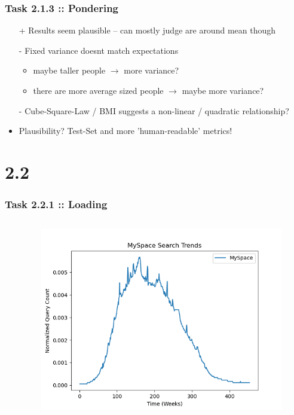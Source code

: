\documentclass[10pt,aspectratio=169,handout]{beamer}
\begin{document}
\begin{frame}
    \frametitle{Task 2.1.3 :: Pondering}

    \begin{itemize}
        \item[+] Results seem plausible -- can mostly judge are around mean though
        \item[-] Fixed variance doesnt match expectations
        \begin{itemize}
            \item maybe taller people $\rightarrow$ more variance?
            \item there are more average sized people $\rightarrow$ maybe more variance? 
        \end{itemize}
        \item[-] Cube-Square-Law / BMI suggests a non-linear / quadratic relationship?
        \item    Plausibility? Test-Set and more 'human-readable' metrics!
    \end{itemize}
\end{frame}

\section{2.2}
\begin{frame}
    \frametitle{Task 2.2.1 :: Loading}
    \begin{columns}
    \begin{column}{0.6\textwidth}
        \inputminted[bgcolor=LightGray,fontsize=\small]{python}{code/myspace-pre.py}
    \end{column}
    \begin{column}{0.4\textwidth}
        \begin{figure}
            \includegraphics[width=\textwidth]{images/myspace.png}
        \end{figure}
    \end{column}
    \end{columns}
\end{frame}
\end{document}
